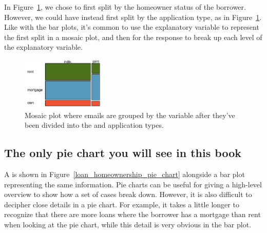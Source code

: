 In Figure~\ref{loan_app_type_home_mosaic_rev},
we chose to first split by the homeowner status
of the borrower.
However, we could have instead first split by
the application type, as in
Figure~\ref{loan_app_type_home_mosaic_rev}.
Like with the bar plots, it's common to use
the explanatory variable to represent the
first split in a mosaic plot,
and then for the response to break
up each level of the explanatory variable.

\begin{figure}[h]
   \centering
   \includegraphics[width=0.37\textwidth]{ch_summarizing_data/figures/loan_app_type_home_mosaic_plot/loan_app_type_home_mosaic_rev}
   \caption{Mosaic plot where emails are grouped by the  variable after they've been divided into the  and  application types.}
   \label{loan_app_type_home_mosaic_rev}
\end{figure}



\subsection{The only pie chart you will see in this book}


A  is shown in
Figure~\ref{loan_homeownership_pie_chart} alongside
a bar plot representing the same information.
Pie charts can be useful for giving a high-level overview
to show how a set of cases break down.
However, it is also difficult to decipher close details
in a pie chart.
For example, it takes a little longer to recognize
that there are more loans where the borrower has
a mortgage than rent when looking at the pie chart,
while this detail is very obvious in the bar plot.

